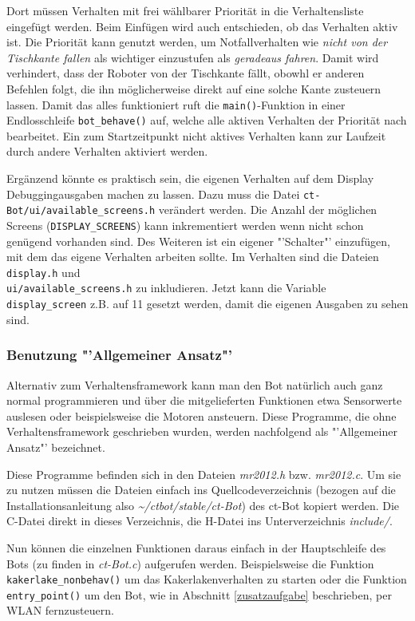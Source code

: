 Dort müssen Verhalten mit frei wählbarer Priorität in die Verhaltensliste
eingefügt werden. Beim Einfügen wird auch entschieden, ob das Verhalten
aktiv ist. Die Priorität kann genutzt werden, um Notfallverhalten wie
\textit{nicht von der Tischkante fallen} als wichtiger einzustufen als
\textit{geradeaus fahren}. Damit wird verhindert, dass der Roboter von der
Tischkante fällt, obowhl er anderen Befehlen folgt, die ihn möglicherweise
direkt auf eine solche Kante zusteuern lassen. Damit das alles funktioniert
ruft die \verb+main()+-Funktion in einer Endlosschleife \verb+bot_behave()+ auf,
welche alle aktiven Verhalten der Priorität nach bearbeitet. Ein zum
Startzeitpunkt nicht aktives Verhalten kann zur Laufzeit durch andere Verhalten
aktiviert werden.

Ergänzend könnte es praktisch sein, die eigenen Verhalten auf dem Display
Debuggingausgaben machen zu lassen. Dazu muss die Datei
\verb+ct-Bot/ui/available_screens.h+ verändert werden. Die Anzahl
der möglichen Screens (\verb+DISPLAY_SCREENS+) kann inkrementiert werden
wenn nicht schon genügend vorhanden sind. Des Weiteren ist ein eigener
"'Schalter"' einzufügen, mit dem das eigene Verhalten arbeiten sollte.
Im Verhalten sind die Dateien \verb+display.h+ und \\
\verb+ui/available_screens.h+ zu inkludieren. Jetzt kann die Variable
\verb+display_screen+ z.B. auf 11 gesetzt werden, damit die eigenen
Ausgaben zu sehen sind. \\

\subsubsection{Benutzung "'Allgemeiner Ansatz"'}
\label{benutzung_allgemein}
Alternativ zum Verhaltensframework kann man den Bot natürlich auch ganz normal programmieren und über die mitgelieferten Funktionen etwa Sensorwerte auslesen oder beispielsweise die Motoren ansteuern. Diese Programme, die ohne Verhaltensframework geschrieben wurden, werden nachfolgend als "'Allgemeiner Ansatz"' bezeichnet.

Diese Programme befinden sich in den Dateien \textit{mr2012.h} bzw. \textit{mr2012.c}. Um sie zu nutzen müssen die Dateien einfach ins Quellcodeverzeichnis (bezogen auf die Installationsanleitung also \textit{\~{}/ctbot/stable/ct-Bot}) des ct-Bot kopiert werden. Die C-Datei direkt in dieses Verzeichnis, die H-Datei ins Unterverzeichnis \textit{include/}.

Nun können die einzelnen Funktionen daraus einfach in der Hauptschleife des Bots (zu finden in \textit{ct-Bot.c}) aufgerufen werden. 
Beispielsweise die Funktion \verb+kakerlake_nonbehav()+ um das Kakerlakenverhalten zu starten oder die Funktion \verb+entry_point()+ um den Bot, wie in Abschnitt \ref{zusatzaufgabe} beschrieben, per WLAN fernzusteuern.
